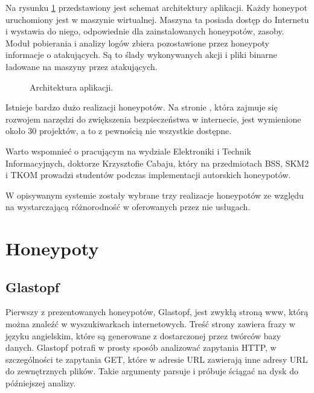 \documentclass[runningheads,a4paper]{llncs}
\begin{document}
Na rysunku \ref{fig:architektura_fig} przedstawiony jest schemat architektury aplikacji. Każdy honeypot uruchomiony jest w maszynie wirtualnej. Maszyna ta posiada dostęp do Internetu i wystawia do niego, odpowiednie dla zainstalowanych honeypotów, zasoby. Moduł pobierania i analizy logów zbiera pozostawione przez honeypoty informacje o atakujących. Są to ślady wykonywanych akcji i pliki binarne ładowane na maszyny przez atakujących.

\begin{figure}
        \centering
        \caption{Architektura aplikacji.}
        \label{fig:architektura_fig}
\end{figure}

Istnieje bardzo dużo realizacji honeypotów. Na stronie \cite{honeynet_project}, która zajmuje się rozwojem narzędzi do zwiększenia bezpieczeństwa w internecie, jest wymienione około 30 projektów, a to z pewnością nie wszystkie dostępne.

Warto wspomnieć o pracującym na wydziale Elektroniki i Technik Informacyjnych, doktorze Krzysztofie Cabaju, który na przedmiotach BSS, SKM2 i TKOM prowadzi studentów podczas implementacji autorskich honeypotów.

W opisywanym systemie zostały wybrane trzy realizacje honeypotów ze względu na wystarczającą różnorodność w oferowanych przez nie usługach.

\section{Honeypoty}

\subsection{Glastopf}
Pierwszy z prezentowanych honeypotów, Glastopf, jest zwykłą stroną www, którą można znaleźć w wyszukiwarkach internetowych. Treść strony zawiera frazy w języku angielskim, które są generowane z dostarczonej przez twórców bazy danych. Glastopf potrafi w prosty sposób analizować zapytania HTTP, w szczególności te zapytania GET, które w adresie URL zawierają inne adresy URL do zewnętrznych plików. Takie argumenty parsuje i próbuje ściągać na dysk do późniejszej analizy.
\end{document}
